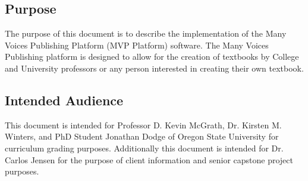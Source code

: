 \documentclass[letterpaper, 10pt, draftclsnofoot, compsoc, onecolumn]{IEEEtran}
\begin{document}
\subsection{Purpose}
{\noindent The purpose of this document is to describe the implementation
of the Many Voices Publishing Platform (MVP Platform) software.
The Many Voices Publishing platform is designed to allow for the creation
of textbooks by College and University professors or any person interested
in creating their own textbook.\par}

\subsection{Intended Audience}
{\noindent This document is intended for Professor D. Kevin McGrath,
Dr. Kirsten M. Winters, and PhD Student Jonathan Dodge of Oregon State
University for curriculum grading purposes.
Additionally this document is intended for Dr. Carlos Jensen for the
purpose of client information and senior capstone project purposes.\par}

\end{document}

